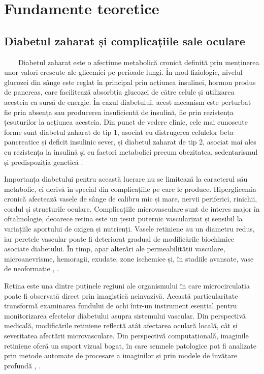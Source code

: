 \documentclass[12pt, a4paper, twoside, romanian]{teza-upb}
\begin{document}
\chapter{Fundamente teoretice}

\section{Diabetul zaharat și complicațiile sale oculare}

\ \ \ \ Diabetul zaharat este o afecțiune metabolică cronică definită prin menținerea unor valori
crescute ale glicemiei pe perioade lungi. În mod fiziologic, nivelul glucozei din
sânge este reglat în principal prin acțiunea insulinei, hormon produs de pancreas,
care facilitează absorbția glucozei de către celule și utilizarea acesteia ca sursă
de energie. În cazul diabetului, acest mecanism este perturbat fie prin absența
sau producerea insuficientă de insulină, fie prin rezistența țesuturilor la acțiunea acesteia.
Din punct de vedere clinic, cele mai cunoscute forme sunt diabetul zaharat
de tip 1, asociat cu distrugerea celulelor beta pancreatice și deficit insulinic
sever, și diabetul zaharat de tip 2, asociat mai ales cu rezistența
la insulină și cu factori metabolici precum obezitatea, sedentarismul și predispoziția genetică
\cite{17_ada2024standards}.
\bigskip

Importanța diabetului pentru această lucrare nu se limitează la caracterul său metabolic,
ci derivă în special din complicațiile pe care le produce. Hiperglicemia
cronică afectează vasele de sânge de calibru mic și mare, nervii periferici,
rinichii, cordul și structurile oculare. Complicațiile microvasculare sunt de interes major în
oftalmologie, deoarece retina este un țesut puternic vascularizat și sensibil la variațiile
aportului de oxigen și nutrienți. Vasele retiniene au un diametru redus, iar
peretele vascular poate fi deteriorat gradual de modificările biochimice asociate diabetului. În
timp, apar alterări ale permeabilității vasculare, microanevrisme, hemoragii, exudate, zone ischemice și,
în stadiile avansate, vase de neoformație \cite{17_ada2024standards}, \cite{18_wong2016diabetic}.
\bigskip

Retina este una dintre puținele regiuni ale organismului în care microcirculația poate
fi observată direct prin imagistică neinvazivă. Această particularitate transformă examinarea fundului de
ochi într-un instrument esențial pentru monitorizarea efectelor diabetului asupra sistemului vascular. Din
perspectivă medicală, modificările retiniene reflectă atât afectarea oculară locală, cât și severitatea
afectării microvasculare. Din perspectivă computațională, imaginile retiniene oferă un suport vizual
bogat, în care semnele patologice pot fi analizate prin metode automate de
procesare a imaginilor și prin modele de învățare profundă \cite{3_gulshan2016development}, \cite{15_li2019diagnostic}.
\bigskip
\end{document}
